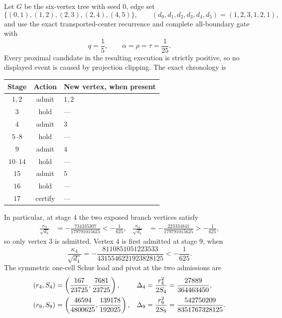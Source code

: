 \begin{proposition}
\label{prop:t-tree-causal-next-admission-stop}
Let $G$ be the six-vertex tree with seed $0$, edge set
\begin{equation}
 \{(0,1),(1,2),(2,3),(2,4),(4,5)\},
 \qquad
 (d_0,d_1,d_2,d_3,d_4,d_5)=(1,2,3,1,2,1),
 \label{eq:t-tree-witness}
\end{equation}
and use the exact transported-center recurrence and complete all-boundary gate
with
\[
 q=\frac15,
 \qquad
 \alpha=\rho=\tau=\frac1{25}.
\]
Every proximal candidate in the resulting execution is strictly positive, so
no displayed event is caused by projection clipping.  The exact chronology is
\begin{center}
\small
\begin{tabular}{@{}ccl@{}}
\toprule
Stage & Action & New vertex, when present \\
\midrule
$1,2$ & admit & $1,2$ \\
$3$ & hold & --- \\
$4$ & admit & $3$ \\
$5$--$8$ & hold & --- \\
$9$ & admit & $4$ \\
$10$--$14$ & hold & --- \\
$15$ & admit & $5$ \\
$16$ & hold & --- \\
$17$ & certify & --- \\
\bottomrule
\end{tabular}
\end{center}
In particular, at stage $4$ the two exposed branch vertices satisfy
\begin{align}
 \frac{\kappa_3}{\sqrt{d_3}}
 &=-\frac{734335307}{179791015625}< -\frac1{625},
 &
 \frac{\kappa_4}{\sqrt{d_4}}
 &=-\frac{223334841}{179791015625}> -\frac1{625},
 \label{eq:t-tree-stage-four-gates}
\end{align}
so only vertex $3$ is admitted.  Vertex $4$ is first admitted at stage $9$,
when
\begin{equation}
 \frac{\kappa_4}{\sqrt{d_4}}
 =-\frac{8110851051223533}{4315546221923828125}
 <-\frac1{625}.
 \label{eq:t-tree-stage-nine-gate}
\end{equation}
The symmetric one-cell Schur load and pivot at the two admissions are
\begin{align}
 (r_4,S_4)&=\left(\frac{167}{23725},\frac{7681}{23725}\right),
 &
 \Delta_4=\frac{r_4^2}{2S_4}
 &=\frac{27889}{364463450},
 \notag\\
 (r_9,S_9)&=\left(\frac{46594}{4800625},\frac{139178}{192025}\right),
 &
 \Delta_9=\frac{r_9^2}{2S_9}
 &=\frac{542750209}{8351767328125}.
 \label{eq:t-tree-schur-drops}
\end{align}


\end{proposition}
